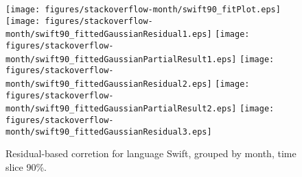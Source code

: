 \begin{figure}[hb]
\centering
{}
{\texttt{[image: figures/stackoverflow-month/swift90\_fitPlot.eps]}}
{\texttt{[image: figures/stackoverflow-month/swift90\_fittedGaussianResidual1.eps]}}
{\texttt{[image: figures/stackoverflow-month/swift90\_fittedGaussianPartialResult1.eps]}}
{\texttt{[image: figures/stackoverflow-month/swift90\_fittedGaussianResidual2.eps]}}
{\texttt{[image: figures/stackoverflow-month/swift90\_fittedGaussianPartialResult2.eps]}}
{\texttt{[image: figures/stackoverflow-month/swift90\_fittedGaussianResidual3.eps]}}
\caption{Residual-based corretion for language Swift, grouped by month, time slice 90\%.}
\end{figure}


\clearpage 
\newpage 


